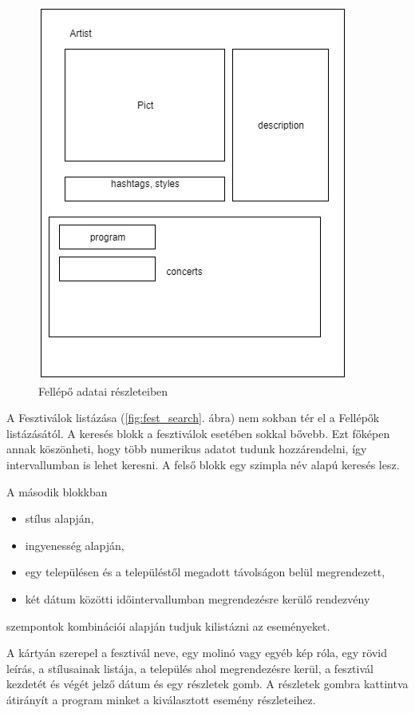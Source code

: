 \begin{figure}
\centering
\includegraphics[scale=0.5]{kepek/artist_details.jpg}
\caption{Fellépő adatai részleteiben}
\label{fig:artist_details}
\end{figure}


A Fesztiválok listázása (\ref{fig:fest_search}. ábra) nem sokban tér el a Fellépők listázásától. A keresés blokk a fesztiválok esetében sokkal bővebb. Ezt főképen annak köszönheti, hogy több numerikus adatot tudunk hozzárendelni, így intervallumban is lehet keresni.
A felső blokk egy szimpla név alapú keresés lesz. 

A második blokkban
\begin{itemize}
\item stílus alapján,
\item ingyenesség alapján,
\item egy településen és a településtől megadott távolságon belül megrendezett, 
\item két dátum közötti időintervallumban megrendezésre kerülő rendezvény
\end{itemize}
szempontok kombinációi alapján tudjuk kilistázni az eseményeket.

A kártyán szerepel a fesztivál neve, egy molinó vagy egyéb kép róla, egy rövid leírás, a stílusainak listája, a település ahol megrendezésre kerül, a  fesztivál kezdetét és végét jelző dátum és egy részletek gomb. A részletek gombra kattintva átirányít a program minket a kiválasztott esemény részleteihez.

